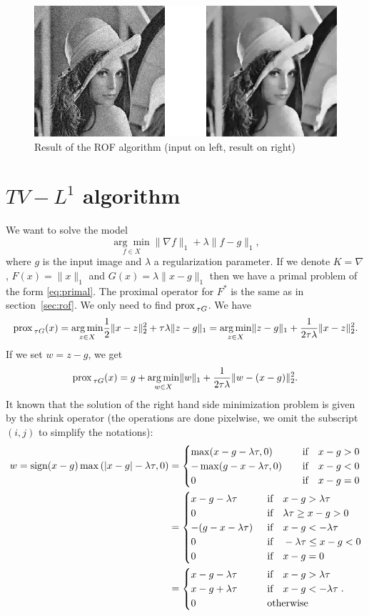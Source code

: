 \documentclass[letter,10pt]{article}
\def\prox{\textup{prox\,}}
\def\sign{\textup{sign}}
\begin{document}
\begin{figure}[H]
\centering\includegraphics[width=\textwidth]{rof.png}
\caption{Result of the ROF algorithm (input on left, result on right)}
\end{figure}

\section{$TV-L^1$ algorithm}
We want to solve the model
$$\underset{f\in X}{\arg\min}\|\nabla f\|_1+\lambda\|f-g\|_1,$$
where $g$ is the input image and $\lambda$ a regularization parameter. If we denote $K=\nabla$, $F(x)=\|x\|_1$ and $G(x)=\lambda\|x-g\|_1$ then we have a primal problem of the form 
\eqref{eq:primal}. The proximal operator for $F^*$ is the same as in section~\ref{sec:rof}. We only need to find $\prox_{\tau G}$. We have
$$\prox_{\tau G}(x)=\underset{z\in X}{\arg\min}\frac{1}{2}\|x-z\|_2^2+\tau\lambda\|z-g\|_1=\underset{z\in X}{\arg\min}\|z-g\|_1+\frac{1}{2\tau\lambda}\|x-z\|_2^2.$$
If we set $w=z-g$, we get
$$\prox_{\tau G}(x)=g+\underset{w\in X}{\arg\min}\|w\|_1+\frac{1}{2\tau\lambda}\|w-(x-g)\|_2^2.$$
It known that the solution of the right hand side minimization problem is given by the shrink operator (the operations are done pixelwise, we omit the subscript $(i,j)$ to simplify the notations):
\begin{align*}
w=\sign(x-g)\max\left(|x-g|-\lambda\tau,0\right)
&=\begin{cases}
\max(x-g-\lambda\tau,0)\qquad&\text{if}\quad x-g>0\\ 
-\max(g-x-\lambda\tau,0) &\text{if}\quad x-g<0\\ 
0 &\text{if}\quad x-g=0
\end{cases}\\
&=\begin{cases}
x-g-\lambda\tau\qquad&\text{if}\quad x-g>\lambda\tau\\
0 &\text{if}\quad \lambda\tau\geq x-g>0\\
-(g-x-\lambda\tau) &\text{if}\quad x-g<-\lambda\tau\\
0 &\text{if}\quad -\lambda\tau\leq x-g<0\\
0 &\text{if}\quad x-g=0
\end{cases}\\
&=\begin{cases}
x-g-\lambda\tau\qquad&\text{if}\quad x-g>\lambda\tau\\
x-g+\lambda\tau &\text{if}\quad x-g<-\lambda\tau\\
0&\text{otherwise}
\end{cases}.
\end{align*}
\end{document}
